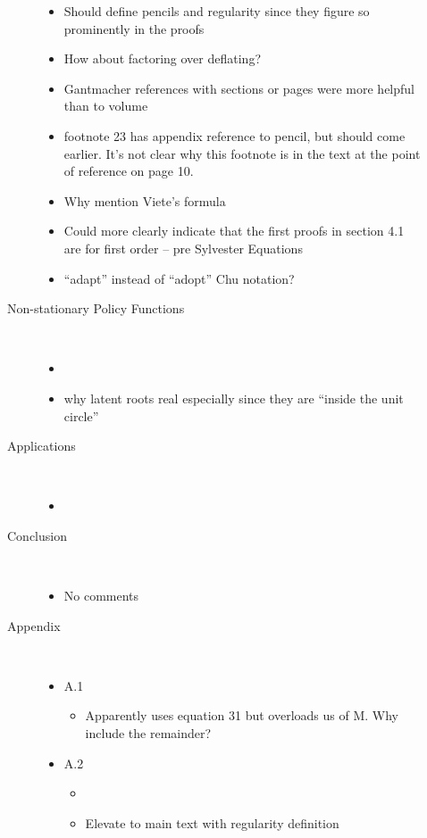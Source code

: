 \documentclass{article}
\begin{document}
\begin{description}
\begin{description}
\begin{itemize}
    \item Should define pencils and regularity since they figure so prominently in the proofs
    \item How about factoring over deflating?
    \item Gantmacher references with sections or pages were more helpful than to volume
  \item footnote 23 has appendix reference to pencil, but should come earlier.
It's not clear why this footnote is in the text at the point of reference on page 10.
\item Why mention Viete's formula
\item Could more clearly indicate that the first proofs in section 4.1 are for first order -- pre Sylvester Equations
\item ``adapt'' instead of  ``adopt'' Chu notation?
    \end{itemize}
  \item[Non-stationary Policy Functions]\ 

    \begin{itemize}
    \item \sap
    \item why latent roots real  especially since they are ``inside the unit circle''
    \end{itemize}

  \item[Applications]\ 

    \begin{itemize}
    \item \sap
    \end{itemize}
  \item[Conclusion]\ 

    \begin{itemize}
    \item No comments
    \end{itemize}


  \item[Appendix] \ 

    \begin{itemize}
    \item A.1

      \begin{itemize}
      \item Apparently uses \cite{vetter1973} equation 31 but overloads us of M.
Why include the remainder?
      \end{itemize}

    \item A.2
      \begin{itemize}
      \item \sap
      \item Elevate to main text with regularity definition
      \end{itemize}
    \end{itemize}
  \end{description}
\end{description}




\end{document}
